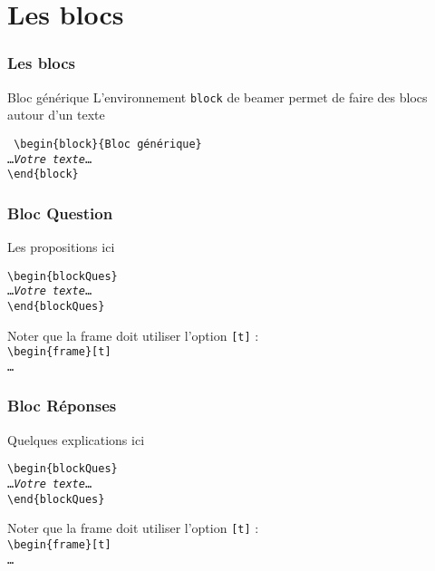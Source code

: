 \documentclass[aspectratio=169]{beamer}
\begin{document}
\section{Les blocs}
\begin{frame}
\frametitle{Les \og blocs\fg}
\begin{block}{Bloc générique}
L'environnement \texttt{block} de beamer permet de faire des blocs
autour d'un texte
\end{block}
\noindent\texttt{%
\textbackslash begin\{block\}\{Bloc générique\}\\
\ldots\emph{Votre texte}\ldots\\
\textbackslash end\{block\}
}%
\end{frame}
\begin{frame}[t]
\frametitle{Bloc \og Question\fg}
\begin{blockQues}
Les propositions ici
\end{blockQues}
\noindent\texttt{\textbackslash begin\{blockQues\}\\
\ldots\emph{Votre texte}\ldots\\
\textbackslash end\{blockQues\}
}%

Noter que la frame doit utiliser l'option \texttt{[t]} :\\

\noindent\texttt{\textbackslash begin\{frame\}[t]\\ 
    \ldots\\
}%
\end{frame}
\begin{frame}[t]
\frametitle{Bloc \og Réponses\fg}
\begin{blockRep}
    Quelques explications ici
\end{blockRep}
\noindent\texttt{\textbackslash begin\{blockQues\}\\
\ldots\emph{Votre texte}\ldots\\
\textbackslash end\{blockQues\}
}%

Noter que la frame doit utiliser l'option \texttt{[t]} :\\

\noindent\texttt{\textbackslash begin\{frame\}[t]\\ 
    \ldots\\
}%
\end{frame}
\end{document}
